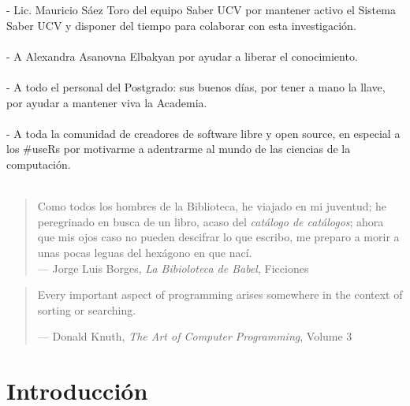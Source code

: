 \documentclass[
  12pt,
  openany]{book}
\begin{document}
- Lic. Mauricio Sáez Toro del equipo Saber UCV por mantener activo el Sistema Saber UCV y disponer del tiempo para colaborar con esta investigación.\\\\
- A Alexandra Asanovna Elbakyan por ayudar a liberar el conocimiento.\\\\
- A todo el personal del Postgrado: sus buenos días, por tener a mano la llave, por ayudar a mantener viva la Academia.\\\\
- A toda la comunidad de creadores de software libre y open source, en especial a los \#useRs por motivarme a adentrarme al mundo de las ciencias de la computación.\\\\


\newpage
\thispagestyle{empty}
\vspace*{5cm}
\hfill
\begin{minipage}{0.70\textwidth}
\begin{quote}
Como todos los hombres de la Biblioteca, he viajado en mi juventud; he peregrinado en busca de un libro, acaso del \emph{catálogo de catálogos}; ahora que mis ojos caso no pueden descifrar lo que escribo, me preparo a morir a unas pocas leguas del hexágono en que nací.\\
--- Jorge Luis Borges, \textit{La Bibioloteca de Babel}, Ficciones
\end{quote}
\hspace*{2cm}

\begin{quote}
Every important aspect of programming arises somewhere in the context of sorting or searching.

--- Donald Knuth, \textit{The Art of Computer Programming}, Volume 3
\end{quote}
\end{minipage}

\thispagestyle{empty}
\maketitle



{
\setcounter{tocdepth}{2}
\tableofcontents
}
\listoffigures
\listoftables
\clearpage
{}

\hypertarget{introduccion}{%
\chapter{Introducción}\label{introduccion}}
\end{document}

